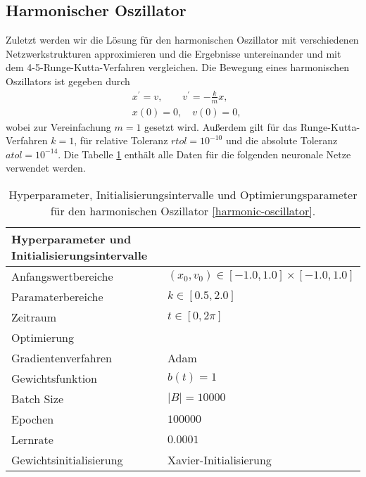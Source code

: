 \subsection{Harmonischer Oszillator}
\label{sec:harmonischer-oszillator}
Zuletzt werden wir die Lösung für den harmonischen Oszillator \cite[8]{flamantSolvingDifferentialEquations2020} mit
verschiedenen Netzwerkstrukturen approximieren und die Ergebnisse untereinander und mit dem 4-5-Runge-Kutta-Verfahren
vergleichen. Die Bewegung eines harmonischen Oszillators ist gegeben durch
\begin{align}
       \label{harmonic-oscillator}
       &x^{\prime}=v, \qquad v^{\prime}=-\frac{k}{m}x, \\
       &x(0)=0, \quad v(0)=0, \nonumber
\end{align}
wobei zur Vereinfachung $m=1$ gesetzt wird. Außerdem gilt für das Runge-Kutta-Verfahren $k=1$, für relative Toleranz
$rtol = 10^{-10}$ und die absolute Toleranz $atol = 10^{-14}$. Die Tabelle \ref{stiff-table-data} enthält alle Daten
für die folgenden neuronale Netze verwendet werden.
\begin{table}
       \renewcommand{\arraystretch}{1.0}
       \centering
       \begin{tabular}{ l | l }
              \hline
              Hyperparameter und Initialisierungsintervalle & \\
              \hline
              Anfangswertbereiche &
              $(x_{0},v_0) \in [-1.0, 1.0] \times [-1.0, 1.0]$ \\
              Paramaterbereiche & $k \in [0.5, 2.0]$ \\
              Zeitraum & $t \in [0, 2\pi]$ \\
              \hline
              Optimierung & \\
              \hline
              Gradientenverfahren & Adam \\
              Gewichtsfunktion & $b(t)=1$ \\
              Batch Size & $|B|=10000$ \\
              Epochen & $100000$ \\
              Lernrate & $0.0001$ \\
              Gewichtsinitialisierung & Xavier-Initialisierung \\
              \hline
       \end{tabular}
       \caption{Hyperparameter, Initialisierungsintervalle und Optimierungsparameter für den harmonischen Oszillator
       \eqref{harmonic-oscillator}.}
       \label{stiff-table-data}
\end{table}
